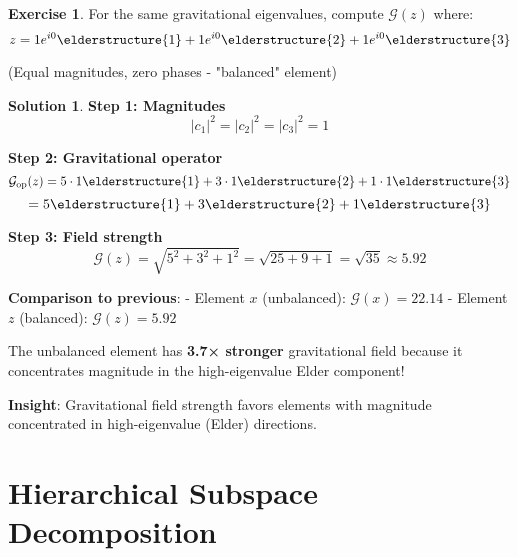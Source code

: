 \documentclass[12pt,a4paper]{article}
\theoremstyle{definition}
\newtheorem{exercise}{Exercise}[section]
\newtheorem{solution}{Solution}[section]
\theoremstyle{remark}
\begin{document}
\begin{exercise}
For the same gravitational eigenvalues, compute $\mathcal{G}(z)$ where:
$$z = 1e^{i0}\elderstructure{1} + 1e^{i0}\elderstructure{2} + 1e^{i0}\elderstructure{3}$$

(Equal magnitudes, zero phases - "balanced" element)
\end{exercise}

\begin{solution}
\textbf{Step 1: Magnitudes}
$$|c_1|^2 = |c_2|^2 = |c_3|^2 = 1$$

\textbf{Step 2: Gravitational operator}
$$\mathcal{G}_{\text{op}}(z) = 5 \cdot 1 \elderstructure{1} + 3 \cdot 1 \elderstructure{2} + 1 \cdot 1 \elderstructure{3}$$
$$= 5\elderstructure{1} + 3\elderstructure{2} + 1\elderstructure{3}$$

\textbf{Step 3: Field strength}
$$\mathcal{G}(z) = \sqrt{5^2 + 3^2 + 1^2} = \sqrt{25 + 9 + 1} = \sqrt{35} \approx 5.92$$

\textbf{Comparison to previous}: 
- Element $x$ (unbalanced): $\mathcal{G}(x) = 22.14$
- Element $z$ (balanced): $\mathcal{G}(z) = 5.92$

The unbalanced element has \textbf{3.7× stronger} gravitational field because it concentrates magnitude in the high-eigenvalue Elder component!

\textbf{Insight}: Gravitational field strength favors elements with magnitude concentrated in high-eigenvalue (Elder) directions.
\end{solution}

\newpage
\section{Hierarchical Subspace Decomposition}
\end{document}
